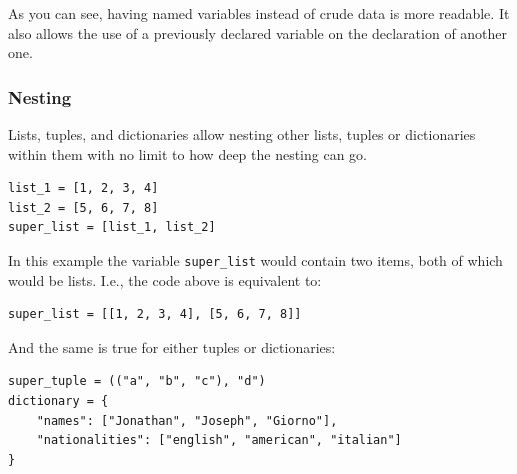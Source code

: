 \documentclass[a4paper,12pt]{article}
\begin{document}
As you can see, having named variables instead of crude data is more readable. It also allows the use of a previously declared variable on the declaration of another one.

\subsubsection{Nesting}

Lists, tuples, and dictionaries allow nesting other lists, tuples or dictionaries within them with no limit to how deep the nesting can go.

\begin{tcolorbox}[
    enhanced,
    attach boxed title to top left={xshift=6mm,yshift=-3mm},
    colback=lightgreen!20,
    colframe=lightgreen,
    colbacktitle=lightgreen,
    title=Python,
    fonttitle=\bfseries\color{black},
    boxed title style={size=small,colframe=lightgreen,sharp corners},
    sharp corners,
    ]
    \begin{verbatim}
list_1 = [1, 2, 3, 4]
list_2 = [5, 6, 7, 8]
super_list = [list_1, list_2]
    \end{verbatim}
\end{tcolorbox}

In this example the variable \verb|super_list| would contain two items, both of which would be lists. I.e., the code above is equivalent to:

\begin{tcolorbox}[
    enhanced,
    attach boxed title to top left={xshift=6mm,yshift=-3mm},
    colback=lightgreen!20,
    colframe=lightgreen,
    colbacktitle=lightgreen,
    title=Python,
    fonttitle=\bfseries\color{black},
    boxed title style={size=small,colframe=lightgreen,sharp corners},
    sharp corners,
    ]
    \begin{verbatim}
super_list = [[1, 2, 3, 4], [5, 6, 7, 8]]
    \end{verbatim}
\end{tcolorbox}

And the same is true for either tuples or dictionaries:

\begin{tcolorbox}[
    enhanced,
    attach boxed title to top left={xshift=6mm,yshift=-3mm},
    colback=lightgreen!20,
    colframe=lightgreen,
    colbacktitle=lightgreen,
    title=Python,
    fonttitle=\bfseries\color{black},
    boxed title style={size=small,colframe=lightgreen,sharp corners},
    sharp corners,
    ]
    \begin{verbatim}
super_tuple = (("a", "b", "c"), "d")
dictionary = {
    "names": ["Jonathan", "Joseph", "Giorno"],
    "nationalities": ["english", "american", "italian"]
}
    \end{verbatim}
\end{tcolorbox}
\end{document}
